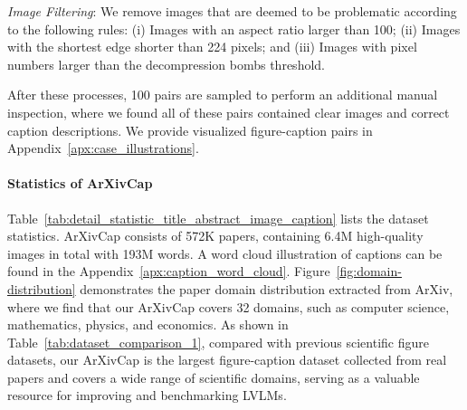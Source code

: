 \noindent\emph{Image Filtering}: We remove images that are deemed to be problematic according to the following rules:
(i) Images with an aspect ratio larger than 100; (ii) Images with the shortest edge shorter than 224 pixels; and (iii) Images with pixel numbers larger than the decompression bombs threshold.

After these processes, 100 pairs are sampled to perform an additional manual inspection, where we found all of these pairs contained clear images and correct caption descriptions. We provide visualized figure-caption pairs in Appendix~\ref{apx:case_illustrations}.
\paragraph{Statistics of ArXivCap}





Table~\ref{tab:detail_statistic_title_abstract_image_caption} lists the dataset statistics. 
ArXivCap consists of 572K papers, containing 6.4M high-quality images in total with 193M words. 
A word cloud illustration of captions can be found in the Appendix~\ref{apx:caption_word_cloud}.
Figure~\ref{fig:domain-distribution} demonstrates the paper domain distribution extracted from ArXiv, where we find that our ArXivCap covers 32 domains, such as computer science, mathematics, physics, and economics.
As shown in Table~\ref{tab:dataset_comparison_1}, compared with previous scientific figure datasets, our ArXivCap is the largest figure-caption dataset collected from real papers and covers a wide range of scientific domains, serving as a valuable resource for improving and benchmarking LVLMs.

